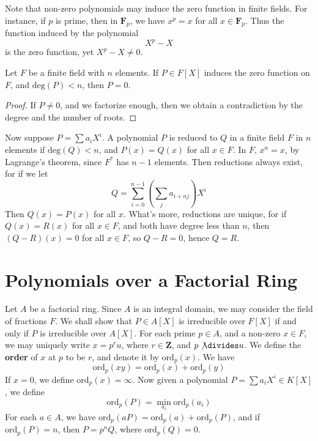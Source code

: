 Note that non-zero polynomials may induce the zero function in finite fields. For instance, if $p$ is prime, then in $\mathbf{F}_p$, we have $x^p = x$ for all $x \in \mathbf{F}_p$. Thus the function induced by the polynomial
%
\[ X^p - X \]
%
is the zero function, yet $X^p - X \neq 0$.

\begin{lemma}
    Let $F$ be a finite field with $n$ elements. If $P \in F[X]$ induces the zero function on $F$, and $\text{deg}(P) < n$, then $P = 0$.
\end{lemma}
\begin{proof}
    If $P \neq 0$, and we factorize enough, then we obtain a contradiction by the degree and the number of roots.
\end{proof}

Now suppose $P = \sum a_i X^i$. A polynomial $P$ is reduced to $Q$ in a finite field $F$ in $n$ elements if $\text{deg}(Q) < n$, and $P(x) = Q(x)$ for all $x \in F$. In $F$, $x^n = x$, by Lagrange's theorem, since $F^*$ has $n-1$ elements. Then reductions always exist, for if we let
%
\[ Q = \sum_{i = 0}^{n-1} \left( \sum_j a_{i + nj} \right) X^i \]
%
Then $Q(x) = P(x)$ for all $x$. What's more, reductions are unique, for if $Q(x) = R(x)$ for all $x \in F$, and both have degree less than $n$, then $(Q - R)(x) = 0$ for all $x \in F$, so $Q - R = 0$, hence $Q = R$.






\section{Polynomials over a Factorial Ring}

Let $A$ be a factorial ring. Since $A$ is an integral domain, we may consider the field of fractions $F$. We shall show that $P \in A[X]$ is irreducible over $F[X]$ if and only if $P$ is irreducible over $A[X]$. For each prime $p \in A$, and a non-zero $x \in F$, we may uniquely write $x = p^r u$, where $r \in \mathbf{Z}$, and $p \not \divides u$. We define the {\bf order} of $x$ at $p$ to be $r$, and denote it by $\text{ord}_p(x)$. We have
%
\[ \text{ord}_p(xy) = \text{ord}_p(x) + \text{ord}_p(y) \]
%
If $x = 0$, we define $\text{ord}_p(x) = \infty$. Now given a polynomial $P = \sum a_i X^i \in K[X]$, we define
%
\[ \text{ord}_p(P) = \min_{a_i} \text{ord}_p(a_i) \]
%
For each $a \in A$, we have $\text{ord}_p(aP) = \text{ord}_p(a) + \text{ord}_p(P)$, and if $\text{ord}_p(P) = n$, then $P = p^n Q$, where $\text{ord}_p(Q) = 0$.

